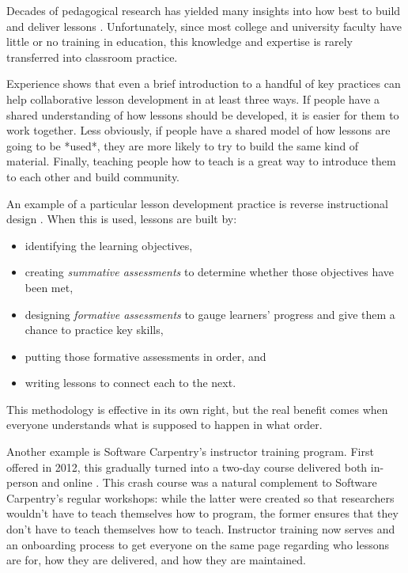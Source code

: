 \documentclass[10pt,letterpaper]{article}
\begin{document}
Decades of pedagogical research has yielded many insights into
how best to build and deliver lessons \cite{hlw}.
Unfortunately,
since most college and university faculty have little or no training in education,
this knowledge and expertise is rarely transferred into classroom practice.

Experience shows that even a brief introduction to a handful of key practices
can help collaborative lesson development in at least three ways.
If people have a shared understanding of how lessons should be developed,
it is easier for them to work together.
Less obviously,
if people have a shared model of how lessons are going to be *used*,
they are more likely to try to build the same kind of material.
Finally,
teaching people how to teach is a great way to introduce them to each other and build community.

An example of a particular lesson development practice is reverse instructional design
\cite{wiggins-mctighe}.
When this is used,
lessons are built by:

\begin{itemize}

\item
  identifying the learning objectives,

\item
  creating \emph{summative assessments} to determine whether those objectives have been met,

\item
  designing \emph{formative assessments} to gauge learners' progress
  and give them a chance to practice key skills,

\item
  putting those formative assessments in order,
  and

\item
  writing lessons to connect each to the next.

\end{itemize}

This methodology is effective in its own right,
but the real benefit comes when everyone understands what is supposed to happen
in what order.

Another example is Software Carpentry's instructor training program.
First offered in 2012,
this gradually turned into a two-day course delivered both in-person and online
\cite{lessons-learned}.
This crash course was a natural complement to Software Carpentry's regular workshops:
while the latter were created so that researchers wouldn't have to teach themselves how to program,
the former ensures that they don't have to teach themselves how to teach.
Instructor training now serves and an onboarding process to get everyone on the same page
regarding who lessons are for,
how they are delivered,
and how they are maintained.
\end{document}
